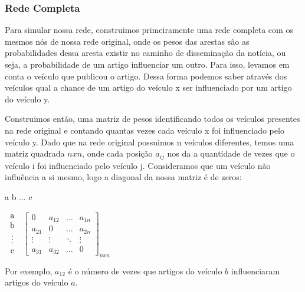 \documentclass[a4paper,12pt]{article}
\begin{document}
\subsubsection{Rede Completa}

 Para simular nossa rede, construimos primeiramente uma rede completa com os mesmos nós de nossa rede original, onde os pesos das arestas
 são as probabilidades dessa aresta existir no caminho de disseminação da notícia, ou seja, a probabilidade de um artigo influenciar um 
 outro. Para isso, levamos em conta o veículo que publicou o artigo. Dessa forma podemos saber 
 através dos veículos qual a chance de um artigo do veículo x ser influenciado por um artigo do veículo y.

 Construimos então, uma matriz de pesos identificando todos os veículos presentes na rede original e contando quantas vezes
 cada veículo x foi influenciado pelo veículo y. Dado que na rede original possuimos n
 veículos diferentes, temos uma matriz quadrada $nxn$, onde cada posição $a_{ij}$ nos da a quantidade de vezes que o veículo i foi influenciado
 pelo veículo j. Consideramos que um veículo não influência a si mesmo, logo a diagonal da nossa matriz é de zeros:
 \pagebreak
 
 \begin{center}
 \hspace{0.2cm}a \hspace{0.5cm} b \hspace{0.3cm} $\hdots$ \hspace{0.4cm}c
 
 \vspace{0.2cm}
 $
 \begin{tabular}{c}
   a \\
   b \\
   \vdots\\
   c
 \end{tabular}
$
 $
 \begin{bmatrix}
  0 & a_{12} & \hdots & a_{1n}\\
  a_{21} & 0 & \hdots & a_{2n}\\
  \vdots & \vdots & \ddots & \vdots\\
  a_{31} & a_{32} & \hdots & 0
 \end{bmatrix}_{nxn}
$

\end{center}

\vspace{0.4cm}
Por exemplo, $a_{12}$ é o número de vezes que artigos do veículo $b$ influenciaram artigos do veículo $a$.
\end{document}
